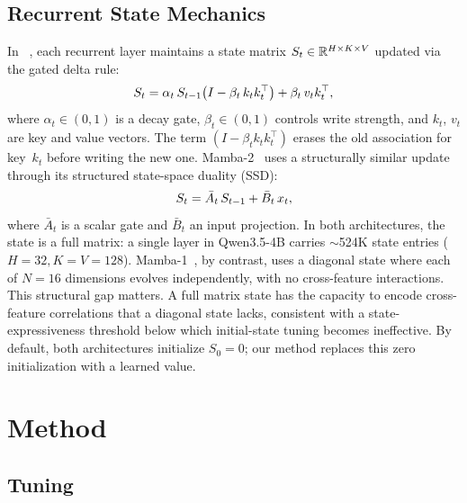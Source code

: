 \documentclass{article}
\begin{document}
\subsection{Recurrent State Mechanics}
\label{sec:bg_state}

In \gdn~\cite{gated_deltanet}, each recurrent layer maintains a state matrix
$S_t \in \mathbb{R}^{H \times K \times V}$ updated via the gated delta rule:
\begin{equation}
  S_t = \alpha_t\, S_{t-1}\!\left(I - \beta_t\, k_t k_t^\top\right) + \beta_t\, v_t k_t^\top,
  \label{eq:gdn_update}
\end{equation}
where $\alpha_t \in (0,1)$ is a decay gate, $\beta_t \in (0,1)$ controls write
strength, and $k_t$, $v_t$ are key and value vectors.
The term $(I - \beta_t k_t k_t^\top)$ erases the old association for key~$k_t$
before writing the new one.
Mamba-2~\cite{mamba2} uses a structurally similar update through its structured
state-space duality (SSD):
\begin{equation}
  S_t = \bar{A}_t\, S_{t-1} + \bar{B}_t\, x_t,
  \label{eq:ssd_update}
\end{equation}
where $\bar{A}_t$ is a scalar gate and $\bar{B}_t$ an input projection.
In both architectures, the state is a full matrix: a single \gdn layer in
Qwen3.5-4B carries ${\sim}$524K state entries ($H{=}32, K{=}V{=}128$).
Mamba-1~\cite{mamba}, by contrast, uses a diagonal state where each of $N{=}16$
dimensions evolves independently, with no cross-feature interactions.
This structural gap matters.
A full matrix state has the capacity to encode cross-feature correlations that a diagonal state lacks, consistent with a state-expressiveness threshold below which initial-state tuning becomes ineffective.
By default, both architectures initialize $S_0 = 0$; our method replaces this
zero initialization with a learned value.

\section{Method}
\label{sec:method}

\subsection{\methodshort Tuning}
\label{sec:method_s0}
\end{document}
